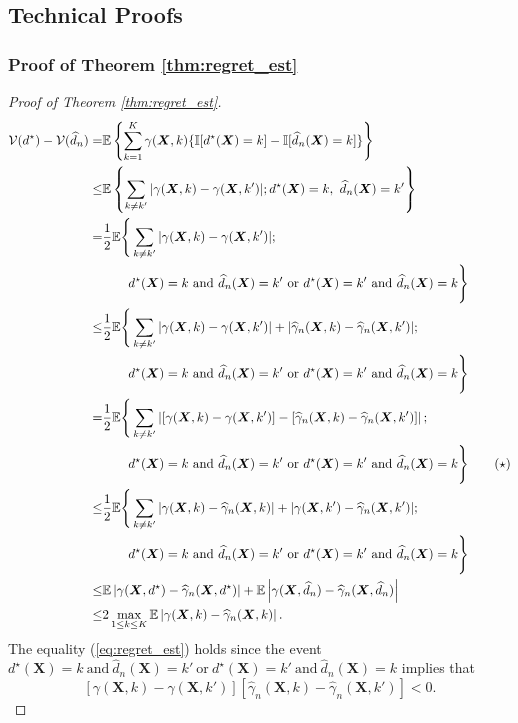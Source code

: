 \documentclass[11pt]{article}
\numberwithin{equation}{section}
\theoremstyle{definition}
\theoremstyle{remark}
\newcommand{\bX}{\bm{X}}
\newcommand{\bbE}{\mathbb{E}}
\newcommand{\bbI}{\mathbb{I}}
\newcommand{\cV}{\mathcal{V}}
\newcommand{\bbone}{\bbI}	%
\begin{document}
\newpage

\subsection{Technical Proofs}\label{sec:proof}

\subsubsection{Proof of Theorem \ref{thm:regret_est}}

\begin{proof}[Proof of Theorem \ref{thm:regret_est}]
	\begin{align*}
	\cV(d^{\star}) - \cV(\widehat{d}_{n}) =& \bbE\left\{ \sum_{k=1}^{K}\gamma(\bX,k)\{ \bbone[d^{\star}(\bX) = k] - \bbone[\widehat{d}_{n}(\bX) = k]\}  \right\}\\
	\le&\bbE\left\{ \sum_{k \ne k'}|\gamma(\bX,k) - \gamma(\bX,k')|;d^{\star}(\bX) = k, ~ \widehat{d}_{n}(\bX) = k' \right\}\\
	=&{1 \over 2}\bbE\Bigg\{ \sum_{k \ne k'}|\gamma(\bX,k) - \gamma(\bX,k')|; \\
	&\qquad d^{\star}(\bX) = k ~ \text{and} ~ \widehat{d}_{n}(\bX) = k' ~ \text{or} ~ d^{\star}(\bX) = k' ~ \text{and} ~ \widehat{d}_{n}(\bX) = k \Bigg\}\\
	\le &{1 \over 2}\bbE\Bigg\{ \sum_{k \ne k'}|\gamma(\bX,k) - \gamma(\bX,k')| + |\widehat{\gamma}_{n}(\bX,k) - \widehat{\gamma}_{n}(\bX,k')|; \\
	&\qquad d^{\star}(\bX) = k ~ \text{and} ~ \widehat{d}_{n}(\bX) = k' ~ \text{or} ~ d^{\star}(\bX) = k' ~ \text{and} ~ \widehat{d}_{n}(\bX) = k \Bigg\}\\
	=&{1 \over 2}\bbE\Bigg\{ \sum_{k \ne k'}\left |[\gamma(\bX,k) - \gamma(\bX,k')]-[\widehat{\gamma}_{n}(\bX,k) - \widehat{\gamma}_{n}(\bX,k')]\right |; \\
	&\qquad d^{\star}(\bX) = k ~ \text{and} ~ \widehat{d}_{n}(\bX) = k' ~ \text{or} ~ d^{\star}(\bX) = k' ~ \text{and} ~ \widehat{d}_{n}(\bX) = k \Bigg\} \tag{$ \star $}\label{eq:regret_est} \\
	\le &{1 \over 2}\bbE\Bigg\{ \sum_{k \ne k'}|\gamma(\bX,k) - \widehat{\gamma}_{n}(\bX,k)| + |\gamma(\bX,k') - \widehat{\gamma}_{n}(\bX,k')|; \\
	&\qquad d^{\star}(\bX) = k ~ \text{and} ~ \widehat{d}_{n}(\bX) = k' ~ \text{or} ~ d^{\star}(\bX) = k' ~ \text{and} ~ \widehat{d}_{n}(\bX) = k \Bigg\}\\
	\le&\bbE\left |\gamma(\bX,d^{\star}) - \widehat{\gamma}_{n}(\bX,d^{\star})\right | + \bbE\left |\gamma(\bX,\widehat{d}_{n}) - \widehat{\gamma}_{n}(\bX,\widehat{d}_{n})\right | \\
	\le & 2\max_{1 \le k \le K}\bbE\left |\gamma(\bX,k) - \widehat{\gamma}_{n}(\bX,k)\right |.
	\end{align*}
	The equality (\ref{eq:regret_est}) holds since the event $ d^{\star}(\bX) = k ~ \text{and} ~ \widehat{d}_{n}(\bX) = k' ~ \text{or} ~ d^{\star}(\bX) = k' ~ \text{and} ~ \widehat{d}_{n}(\bX) = k  $ implies that
	\[ [\gamma(\bX,k) - \gamma(\bX,k')][\widehat{\gamma}_{n}(\bX,k) - \widehat{\gamma}_{n}(\bX,k')] < 0. \]
\end{proof}
\end{document}
